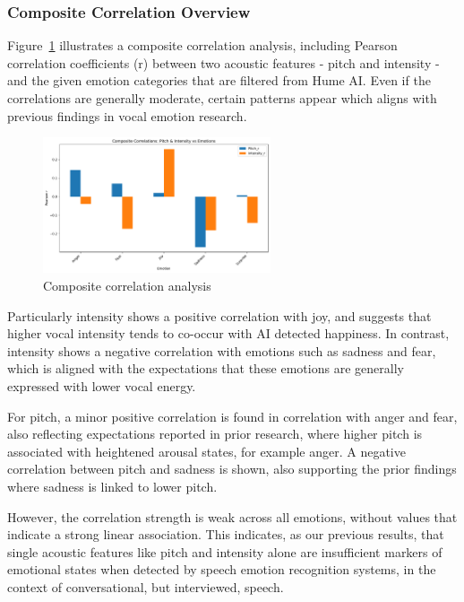 \subsubsection{Composite Correlation Overview}
Figure~\ref{fig:composite} illustrates a composite correlation analysis, including Pearson correlation coefficients (r) between two acoustic features - pitch and intensity - and the given emotion categories that are filtered from Hume AI. Even if the correlations are generally moderate, certain patterns appear which aligns with previous findings in vocal emotion research. 
\begin{figure}[H]
    \centering 
    \includegraphics[width=0.6\textwidth]{png/results/rq1/composite_correlations.pdf}
    \caption{Composite correlation analysis}
    \label{fig:composite}
\end{figure}

Particularly intensity shows a positive correlation with joy, and suggests that higher vocal intensity tends to co-occur with AI detected happiness. In contrast, intensity shows a negative correlation with emotions such as sadness and fear, which is aligned with the expectations that these emotions are generally expressed with lower vocal energy. 

For pitch, a minor positive correlation is found in correlation with anger and fear, also reflecting expectations reported in prior research, where higher pitch is associated with heightened arousal states, for example anger. A negative correlation between pitch and sadness is shown, also supporting the prior findings where sadness is linked to lower pitch. 

However, the correlation strength is weak across all emotions, without values that indicate a strong linear association. This indicates, as our previous results, that single acoustic features like pitch and intensity alone are insufficient markers of emotional states when detected by speech emotion recognition systems, in the context of conversational, but interviewed, speech. 

